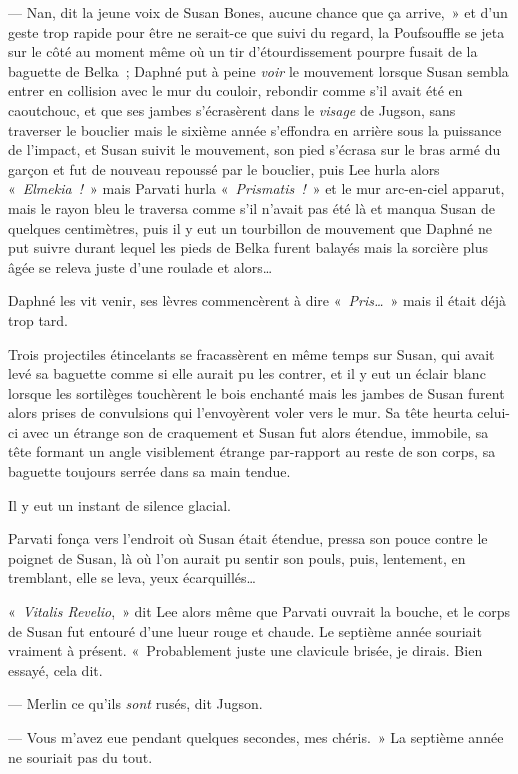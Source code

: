 --- Nan, dit la jeune voix de Susan Bones, aucune chance que ça arrive,~» et d'un geste trop rapide pour être ne serait-ce que suivi du regard, la Poufsouffle se jeta sur le côté au moment même où un tir d'étourdissement pourpre fusait de la baguette de Belka~; Daphné put à peine \emph{voir} le mouvement lorsque Susan sembla entrer en collision avec le mur du couloir, rebondir comme s'il avait été en caoutchouc, et que ses jambes s'écrasèrent dans le \emph{visage} de Jugson, sans traverser le bouclier mais le sixième année s'effondra en arrière sous la puissance de l'impact, et Susan suivit le mouvement, son pied s'écrasa sur le bras armé du garçon et fut de nouveau repoussé par le bouclier, puis Lee hurla alors «~\emph{Elmekia~!}~» mais Parvati hurla «~\emph{Prismatis~!}~» et le mur arc-en-ciel apparut, mais le rayon bleu le traversa comme s'il n'avait pas été là et manqua Susan de quelques centimètres, puis il y eut un tourbillon de mouvement que Daphné ne put suivre durant lequel les pieds de Belka furent balayés mais la sorcière plus âgée se releva juste d'une roulade et alors…

Daphné les vit venir, ses lèvres commencèrent à dire «~\emph{Pris…}~» mais il était déjà trop tard.

Trois projectiles étincelants se fracassèrent en même temps sur Susan, qui avait levé sa baguette comme si elle aurait pu les contrer, et il y eut un éclair blanc lorsque les sortilèges touchèrent le bois enchanté mais les jambes de Susan furent alors prises de convulsions qui l'envoyèrent voler vers le mur.
Sa tête heurta celui-ci avec un étrange son de craquement et Susan fut alors étendue, immobile, sa tête formant un angle visiblement étrange par-rapport au reste de son corps, sa baguette toujours serrée dans sa main tendue.

Il y eut un instant de silence glacial.

Parvati fonça vers l'endroit où Susan était étendue, pressa son pouce contre le poignet de Susan, là où l'on aurait pu sentir son pouls, puis, lentement, en tremblant, elle se leva, yeux écarquillés…

«~\emph{Vitalis Revelio},~» dit Lee alors même que Parvati ouvrait la bouche, et le corps de Susan fut entouré d'une lueur rouge et chaude.
Le septième année souriait vraiment à présent.
«~Probablement juste une clavicule brisée, je dirais.
Bien essayé, cela dit.

--- Merlin ce qu'ils \emph{sont} rusés, dit Jugson.

--- Vous m'avez eue pendant quelques secondes, mes chéris.~»
La septième année ne souriait pas du tout.

